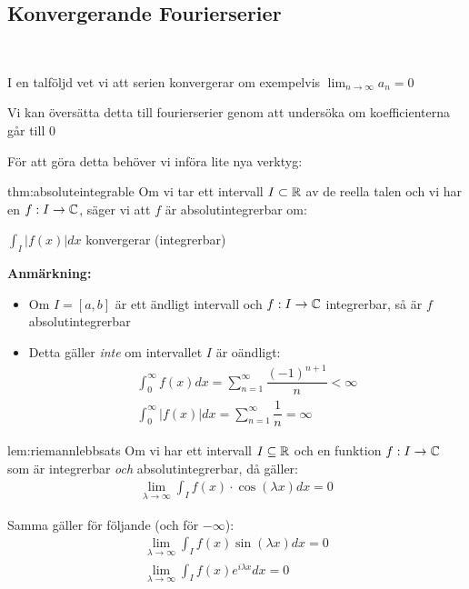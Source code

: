\subsection{Konvergerande Fourierserier}\hfill\\\par
\noindent I en talföljd vet vi att serien konvergerar om exempelvis $\lim_{n\to\infty}a_n = 0$
\par\bigskip
\noindent Vi kan översätta detta till fourierserier genom att undersöka om koefficienterna går till 0 
\par\bigskip
\noindent För att göra detta behöver vi införa lite nya verktyg:
\par\bigskip
\begin{theo}[Absolutintegrerbar]{thm:absoluteintegrable}
  Om vi tar ett intervall $I\subset \mathbb{R}$ av de reella talen och vi har en $f:I\to\mathbb{C}$, säger vi att $f$ är absolutintegrerbar om:\par
  $\int_I |f(x)|dx$ konvergerar (integrerbar)\par
\end{theo}
\par\bigskip
\noindent\textbf{Anmärkning:}\par
\begin{itemize}
  \item Om $I = [a,b]$ är ett ändligt intervall och $f:I\to\mathbb{C}$ integrerbar, så är $f$ absolutintegrerbar\par
  \item Detta gäller \textit{inte} om intervallet $I$ är oändligt:
    \begin{equation*}
      \begin{gathered}
        \int_{0}^{\infty}f(x)dx = \sum_{n=1}^{\infty}\dfrac{(-1)^{n+1}}{n}<\infty\\
        \int_{0}^{\infty}\left|f(x)\right|dx = \sum_{n=1}^{\infty}\dfrac{1}{n} = \infty
      \end{gathered}
    \end{equation*}
\end{itemize}
\par\bigskip
\begin{lem}{lem:riemannlebbsats}
  Om vi har ett intervall $I\subseteq \mathbb{R}$ och en funktion $f:I\to\mathbb{C}$ som är integrerbar \textit{och} absolutintegrerbar, då gäller:
  \begin{equation*}
    \begin{gathered}
      \lim_{\lambda\to\infty}\int_{I}f(x)\cdot\cos(\lambda x)dx = 0
    \end{gathered}
  \end{equation*}
  \par\bigskip
  \noindent Samma gäller för följande (och för $-\infty$):
  \begin{equation*}
    \begin{gathered}
      \lim_{\lambda\to\infty}\int_{I}f(x)\sin(\lambda x)dx = 0\\
      \lim_{\lambda\to\infty}\int_{I}f(x)e^{i\lambda x}dx = 0
    \end{gathered}
  \end{equation*}
\end{lem}
